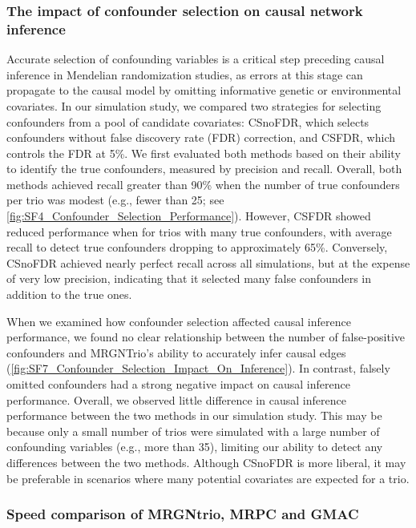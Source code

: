 \documentclass[12pt,letterpaper]{report}
\begin{document}
\begin{doublespace}
\subsubsection*{The impact of confounder selection on causal network inference}

Accurate selection of confounding variables is a critical step preceding causal inference in Mendelian randomization studies, as errors at this stage can propagate to the causal model by omitting informative genetic or environmental covariates. In our simulation study, we compared two strategies for selecting confounders from a pool of candidate covariates: CSnoFDR, which selects confounders without false discovery rate (FDR) correction, and CSFDR, which controls the FDR at 5\%. We first evaluated both methods based on their ability to identify the true confounders, measured by precision and recall. Overall, both methods achieved recall greater than 90\% when the number of true confounders per trio was modest (e.g., fewer than 25; see \autoref{fig:SF4_Confounder_Selection_Performance}). However, CSFDR showed reduced performance when for trios with many true confounders, with average recall to detect true confounders dropping to approximately 65\%. Conversely, CSnoFDR achieved nearly perfect recall across all simulations, but at the expense of very low precision, indicating that it selected many false confounders in addition to the true ones.

When we examined how confounder selection affected causal inference performance, we found no clear relationship between the number of false-positive confounders and MRGNTrio’s ability to accurately infer causal edges (\autoref{fig:SF7_Confounder_Selection_Impact_On_Inference}). In contrast, falsely omitted confounders had a strong negative impact on causal inference performance. Overall, we observed little difference in causal inference performance between the two methods in our simulation study. This may be because only a small number of trios were simulated with a large number of confounding variables (e.g., more than 35), limiting our ability to detect any differences between the two methods. Although CSnoFDR is more liberal, it may be preferable in scenarios where many potential covariates are expected for a trio.


\subsubsection{Speed comparison of MRGNtrio, MRPC and GMAC}


\end{doublespace}
\end{document}
